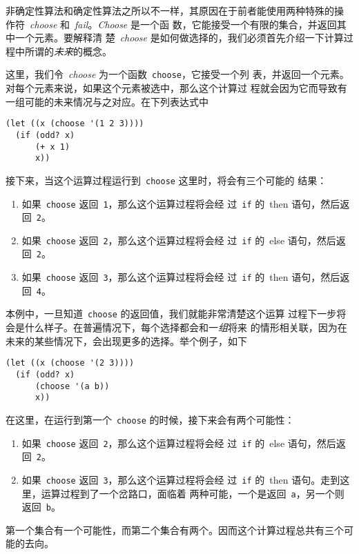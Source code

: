 非确定性算法和确定性算法之所以不一样，其原因在于前者能使用两种特殊的操
作符~\emph{choose}
和~\emph{fail}。\emph{Choose} 是一个函
数，它能接受一个有限的集合，并返回其中一个元素。要解释清
楚~\emph{choose} 是如何做选择的，我们必须首先介绍一下计算过程中所谓的\emph{未来}的概念。

这里，我们令~\emph{choose} 为一个函数~\texttt{choose}，它接受一个列
表，并返回一个元素。对每个元素来说，如果这个元素被选中，那么这个计算过
程就会因为它而导致有一组可能的未来情况与之对应。在下列表达式中
\begin{lstlisting}
(let ((x (choose '(1 2 3))))
  (if (odd? x)
      (+ x 1)
      x))
\end{lstlisting}
接下来，当这个运算过程运行到~\texttt{choose} 这里时，将会有三个可能的
结果：
\begin{enumerate}
\item 如果~\texttt{choose} 返回~\texttt{1}，那么这个运算过程将会经
  过~\texttt{if} 的~then 语句，然后返回~\texttt{2}。
\item 如果~\texttt{choose} 返回~\texttt{2}，那么这个运算过程将会经
  过~\texttt{if} 的~else 语句，然后返回~\texttt{2}。
\item 如果~\texttt{choose} 返回~\texttt{3}，那么这个运算过程将会经
  过~\texttt{if} 的~then 语句，然后返回~\texttt{4}。
\end{enumerate}

本例中，一旦知道~\texttt{choose} 的返回值，我们就能非常清楚这个运算
过程下一步将会是什么样子。在普遍情况下，每个选择都会和一\emph{组}将来
的情形相关联，因为在未来的某些情况下，会出现更多的选择。举个例子，如下
\begin{lstlisting}
(let ((x (choose '(2 3))))
  (if (odd? x)
      (choose '(a b))
      x))
\end{lstlisting}
在这里，在运行到第一个~\texttt{choose} 的时候，接下来会有两个可能性：
\begin{enumerate}
\item 如果~\texttt{choose} 返回~\texttt{2}，那么这个运算过程将会经
  过~\texttt{if} 的~else 语句，然后返回~\texttt{2}。
\item 如果~\texttt{choose} 返回~\texttt{3}，那么这个运算过程将会经
  过~\texttt{if} 的~then 语句。走到这里，运算过程到了一个岔路口，面临着
  两种可能，一个是返回~\texttt{a}，另一个则返回~\texttt{b}。
\end{enumerate}

第一个集合有一个可能性，而第二个集合有两个。因而这个计算过程总共有三个可能的去向。

